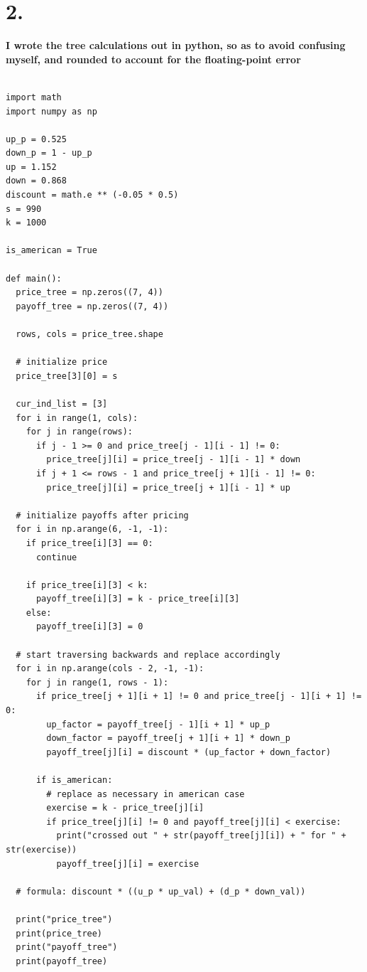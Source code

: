 \documentclass{article}
\begin{document}
\section*{2.}
{\Large

\textbf{I wrote the tree calculations out in python, so as to avoid confusing myself, and rounded to account for the floating-point error}

\begin{verbatim}

import math
import numpy as np

up_p = 0.525
down_p = 1 - up_p
up = 1.152
down = 0.868
discount = math.e ** (-0.05 * 0.5)
s = 990
k = 1000

is_american = True

def main():
  price_tree = np.zeros((7, 4))
  payoff_tree = np.zeros((7, 4))

  rows, cols = price_tree.shape
  
  # initialize price
  price_tree[3][0] = s
  
  cur_ind_list = [3]
  for i in range(1, cols):
    for j in range(rows):
      if j - 1 >= 0 and price_tree[j - 1][i - 1] != 0:
        price_tree[j][i] = price_tree[j - 1][i - 1] * down
      if j + 1 <= rows - 1 and price_tree[j + 1][i - 1] != 0:
        price_tree[j][i] = price_tree[j + 1][i - 1] * up

  # initialize payoffs after pricing
  for i in np.arange(6, -1, -1):
    if price_tree[i][3] == 0:
      continue

    if price_tree[i][3] < k:
      payoff_tree[i][3] = k - price_tree[i][3]
    else:
      payoff_tree[i][3] = 0

  # start traversing backwards and replace accordingly
  for i in np.arange(cols - 2, -1, -1):
    for j in range(1, rows - 1):
      if price_tree[j + 1][i + 1] != 0 and price_tree[j - 1][i + 1] != 0:
        up_factor = payoff_tree[j - 1][i + 1] * up_p
        down_factor = payoff_tree[j + 1][i + 1] * down_p
        payoff_tree[j][i] = discount * (up_factor + down_factor)
      
      if is_american:
        # replace as necessary in american case
        exercise = k - price_tree[j][i]
        if price_tree[j][i] != 0 and payoff_tree[j][i] < exercise:
          print("crossed out " + str(payoff_tree[j][i]) + " for " + str(exercise))
          payoff_tree[j][i] = exercise

  # formula: discount * ((u_p * up_val) + (d_p * down_val))

  print("price_tree")
  print(price_tree)
  print("payoff_tree")
  print(payoff_tree)
  


\end{verbatim}}
\end{document}
